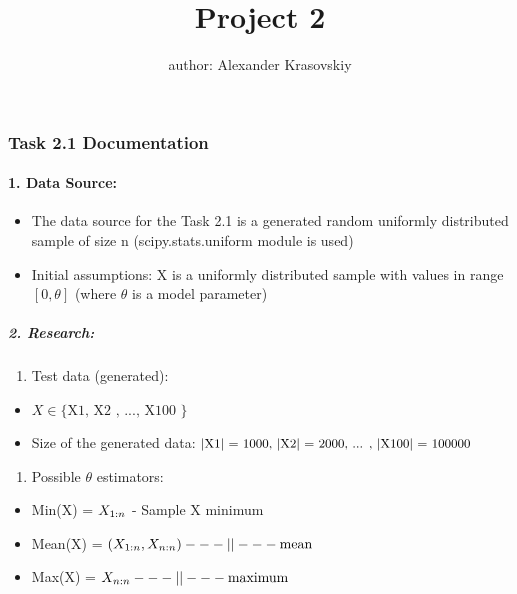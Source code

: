 \documentclass[11pt]{article}
\title{Project 2}
\author{author: Alexander Krasovskiy}
\providecommand{\tightlist}{%
      \setlength{\itemsep}{0pt}\setlength{\parskip}{0pt}}
\begin{document}
    
    \maketitle
    
    

    \hypertarget{task-2.1-documentation}{%
\subsubsection{Task 2.1 Documentation}\label{task-2.1-documentation}}

    \hypertarget{data-source}{%
\paragraph{1. Data Source:}\label{data-source}}

\begin{itemize}
\tightlist
\item
  The data source for the Task 2.1 is a generated random uniformly
  distributed sample of size n (scipy.stats.uniform module is used)
\item
  Initial assumptions: X is a uniformly distributed sample with values in
  range \([0,\theta]\) (where \(\theta\) is a model parameter)
\end{itemize}

    \hypertarget{research-purpose}{%
\subparagraph{2. Research: }\label{research-purpose}}

\begin{enumerate}
\def\labelenumi{\arabic{enumi}.}
\tightlist
\item
  Test data (generated):
\end{enumerate}

\begin{itemize}
\tightlist
\item
  \(X \in \text{\{ X1, X2 , ..., X100 \}}\)
\item
  Size of the generated data:
  \(\small{\text{|X1| = 1000, |X2| = 2000, ... , |X100| = 100000}}\)
\end{itemize}

\vspace{15px}
\begin{enumerate}
\def\labelenumi{\arabic{enumi}.}
\setcounter{enumi}{1}
\tightlist
\item
  Possible \(\theta\) estimators:
\end{enumerate}

\begin{itemize}
\tightlist
\item
  Min(X) = \(\space\space X_{1:n}\space\space\)  -  Sample X minimum
\item
  Mean(X) =
  \(\space\space (X_{1:n}, X_{n:n})\space\space ---||--- \text{mean}\)
\item
  Max(X) = \(\space\space X_{n:n}\space\space ---||--- \text{maximum}\)
\end{itemize}
\end{document}
